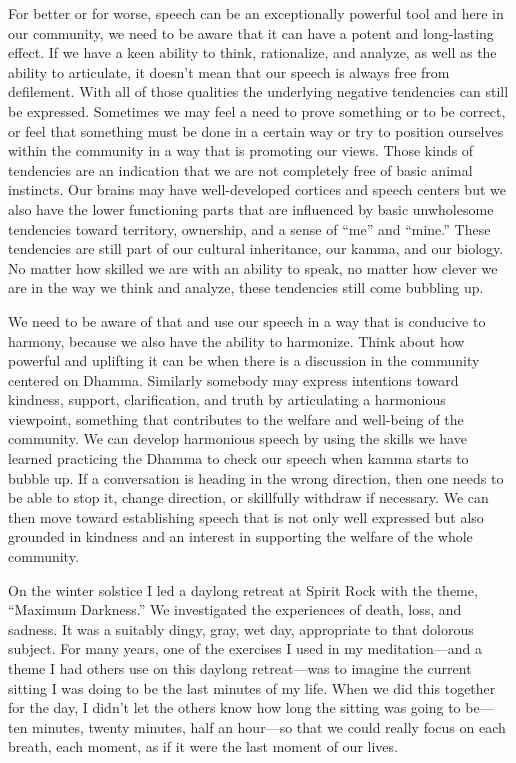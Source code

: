 For better or for worse, speech can be an exceptionally powerful tool 
and here in our community, we need to be aware that it can have a 
potent and long-lasting effect. If we have a keen ability to think, 
rationalize, and analyze, as well as the ability to articulate, it 
doesn't mean that our speech is always free from defilement. With all 
of those qualities the underlying negative tendencies can still be 
expressed. Sometimes we may feel a need to prove something or to be 
correct, or feel that something must be done in a certain way or try to 
position ourselves within the community in a way that is promoting our 
views. Those kinds of tendencies are an indication that we are not 
completely free of basic animal instincts. Our brains may have 
well-developed cortices and speech centers but we also have the lower 
functioning parts that are influenced by basic unwholesome tendencies 
toward territory, ownership, and a sense of ``me'' and ``mine.'' These 
tendencies are still part of our cultural inheritance, our kamma, and 
our biology. No matter how skilled we are with an ability to speak, no 
matter how clever we are in the way we think and analyze, these 
tendencies still come bubbling up.

We need to be aware of that and use our speech in a way that is
conducive to harmony, because we also have the \mbox{ability} to
harmonize.  Think about how powerful and uplifting it can be when there
is a discussion in the community centered on Dhamma. Similarly somebody
may express intentions toward kindness, support, clarification, and
truth by articulating a harmonious viewpoint, something that contributes
to the welfare and well-being of the community. We can develop
harmonious speech by using the skills we have learned practicing the
Dhamma to check our speech when kamma starts to bubble up. If a
conversation is heading in the wrong direction, then one needs to be
able to stop it, change direction, or skillfully withdraw if necessary.
We can then move toward establishing speech that is not only well
expressed but also grounded in kindness and an interest in supporting
the welfare of the whole community.


On the winter solstice I led a daylong retreat at Spirit Rock with the 
theme, ``Maximum Darkness.'' We investigated the experiences of death, 
loss, and sadness. It was a suitably dingy, gray, wet day, appropriate 
to that dolorous subject. For many years, one of the exercises I used 
in my meditation---and a theme I had others use on this daylong 
retreat---was to imagine the current sitting I was doing to be the last 
minutes of my life. When we did this together for the day, I didn't let 
the others know how long the sitting was going to be---ten minutes, 
twenty minutes, half an hour---so that we could really focus on each 
breath, each moment, as if it were the last moment of our lives.

